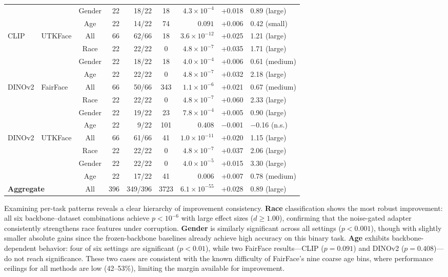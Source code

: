 \begin{table}[tbp]
\begin{tabular}{llcrrcrcl}
 & & Gender & 22 & 18/22 & 18 & $4.3{\times}10^{-4}$ & +0.018 & 0.89 (large) \\
 & & Age & 22 & 14/22 & 74 & $0.091$ & +0.006 & 0.42 (small) \\
\midrule
CLIP & UTKFace & All & 66 & 62/66 & 18 & $3.6{\times}10^{-12}$ & +0.025 & 1.21 (large) \\
 & & Race & 22 & 22/22 & 0 & $4.8{\times}10^{-7}$ & +0.035 & 1.71 (large) \\
 & & Gender & 22 & 18/22 & 18 & $4.0{\times}10^{-4}$ & +0.006 & 0.61 (medium) \\
 & & Age & 22 & 22/22 & 0 & $4.8{\times}10^{-7}$ & +0.032 & 2.18 (large) \\
\midrule
DINOv2 & FairFace & All & 66 & 50/66 & 343 & $1.1{\times}10^{-6}$ & +0.021 & 0.67 (medium) \\
 & & Race & 22 & 22/22 & 0 & $4.8{\times}10^{-7}$ & +0.060 & 2.33 (large) \\
 & & Gender & 22 & 19/22 & 23 & $7.8{\times}10^{-4}$ & +0.005 & 0.90 (large) \\
 & & Age & 22 & 9/22 & 101 & $0.408$ & $-$0.001 & $-$0.16 (n.s.) \\
\midrule
DINOv2 & UTKFace & All & 66 & 61/66 & 41 & $1.0{\times}10^{-11}$ & +0.020 & 1.15 (large) \\
 & & Race & 22 & 22/22 & 0 & $4.8{\times}10^{-7}$ & +0.037 & 2.06 (large) \\
 & & Gender & 22 & 22/22 & 0 & $4.0{\times}10^{-5}$ & +0.015 & 3.30 (large) \\
 & & Age & 22 & 17/22 & 41 & $0.006$ & +0.007 & 0.78 (medium) \\
\midrule
\multicolumn{2}{l}{\textbf{Aggregate}} & All & 396 & 349/396 & 3723 & $6.1{\times}10^{-55}$ & +0.028 & 0.89 (large) \\
\bottomrule
\end{tabular}
\end{table}

Examining per-task patterns reveals a clear hierarchy of improvement consistency.
\textbf{Race} classification shows the most robust improvement: all six backbone--dataset combinations achieve $p < 10^{-6}$ with large effect sizes ($d \geq 1.00$), confirming that the noise-gated adapter consistently strengthens race features under corruption.
\textbf{Gender} is similarly significant across all settings ($p < 0.001$), though with slightly smaller absolute gains since the frozen-backbone baselines already achieve high accuracy on this binary task.
\textbf{Age} exhibits backbone-dependent behavior: four of six settings are significant ($p < 0.01$), while two FairFace results---CLIP ($p = 0.091$) and DINOv2 ($p = 0.408$)---do not reach significance.
These two cases are consistent with the known difficulty of FairFace's nine coarse age bins, where performance ceilings for all methods are low (42--53\%), limiting the margin available for improvement.


